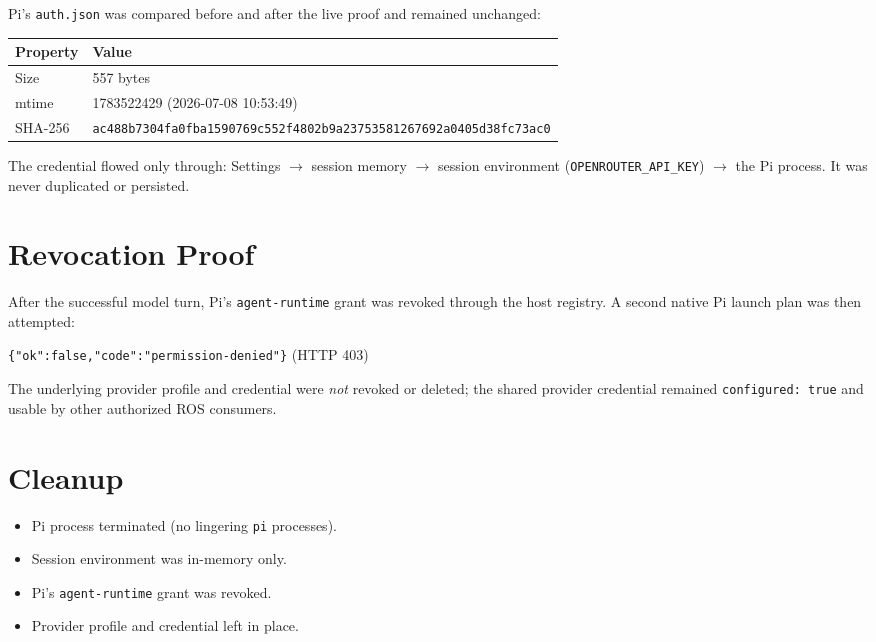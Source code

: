 \documentclass[11pt]{article}
\newcommand{\code}[1]{\texttt{#1}}
\begin{document}
Pi's \code{auth.json} was compared before and after the live proof and remained
unchanged:

\begin{center}
\begin{tabular}{@{}l l@{}}
\toprule
\textbf{Property} & \textbf{Value} \\
\midrule
Size & 557 bytes \\
mtime & 1783522429 (2026-07-08 10:53:49) \\
SHA-256 & \code{ac488b7304fa0fba1590769c552f4802b9a23753581267692a0405d38fc73ac0} \\
\bottomrule
\end{tabular}
\end{center}

\noindent The credential flowed only through: Settings $\rightarrow$ session
memory $\rightarrow$ session environment (\code{OPENROUTER\_API\_KEY})
$\rightarrow$ the Pi process. It was never duplicated or persisted.

\section{Revocation Proof}

After the successful model turn, Pi's \code{agent-runtime} grant was revoked
through the host registry. A second native Pi launch plan was then attempted:

\begin{center}
\code{\{"ok":false,"code":"permission-denied"\}} \quad (HTTP 403)
\end{center}

The underlying provider profile and credential were \emph{not} revoked or
deleted; the shared provider credential remained \code{configured: true} and
usable by other authorized ROS consumers.

\section{Cleanup}

\begin{itemize}
  \item Pi process terminated (no lingering \code{pi} processes).
  \item Session environment was in-memory only.
  \item Pi's \code{agent-runtime} grant was revoked.
  \item Provider profile and credential left in place.
\end{itemize}
\end{document}
